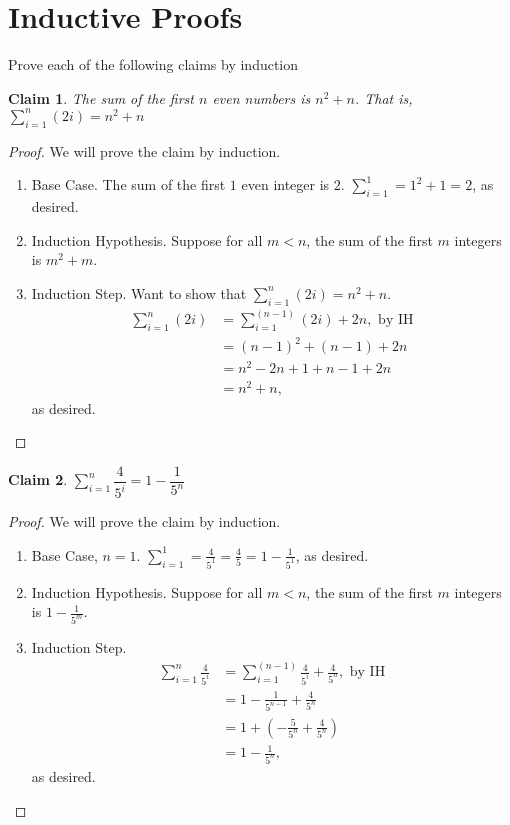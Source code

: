 \documentclass{article}
\newtheorem{claim}{Claim}
\begin{document}
    \section{Inductive Proofs}

    Prove each of the following claims by induction

    \begin{claim}
      The sum of the first $n$ even numbers is $n^2+n$.  That is, $\sum\limits_{i=1}^n (2i) = n^2+n$
    \end{claim}


    \begin{proof}
      We will prove the claim by induction. 
      \begin{enumerate}
        \item Base Case. The sum of the first $1$ even integer is $2$. $\sum_{i=1}^1 = 1^2 + 1 = 2$, as desired. 
        \item Induction Hypothesis. Suppose for all $m<n$, the sum of the first $m$ integers is $m^2+m$. 
        \item Induction Step. Want to show that $\sum\limits_{i=1}^n (2i) = n^2+n$. 
        \begin{align*}
          \sum_{i=1}^n (2i) &=\sum_{i=1}^{(n-1)} (2i) + 2n, \text{ by IH}\\
          &= (n-1)^2 + (n-1) + 2n\\
          &= n^2 - 2n +1 + n - 1 + 2n\\
          &= n^2 + n,
        \end{align*}
        as desired.
      \end{enumerate}
    \end{proof}


    \begin{claim}
      $\sum\limits_{i=1}^{n} \dfrac{4}{5^i} = 1 - \dfrac{1}{5^n}$
    \end{claim}

    \begin{proof}
      We will prove the claim by induction. 
      \begin{enumerate}
        \item Base Case, $n=1$. $\displaystyle\sum_{i=1}^1 = \frac{4}{5^1} = \frac{4}{5}= 1 - \frac{1}{5^1}$, as desired. 
        \item Induction Hypothesis. Suppose for all $m<n$, the sum of the first $m$ integers is $1-\frac{1}{5^m}$. 
        \item Induction Step.
        \begin{align*}
          \sum_{i=1}^n \frac{4}{5^i} &=\sum_{i=1}^{(n-1)} \frac{4}{5^i} + \frac{4}{5^n}, \text{ by IH}\\
          &= 1-\frac{1}{5^{n-1}} + \frac{4}{5^n}\\
          &= 1 + (-\frac{5}{5^n}+\frac{4}{5^n})\\
          &= 1-\frac{1}{5^n},
        \end{align*}
        as desired.
      \end{enumerate}
    \end{proof}
\end{document}
